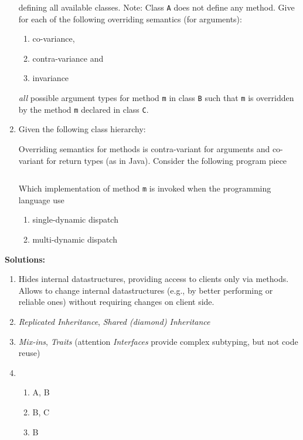 \documentclass{article}
\newcommand{\solution}[1] {\textbf{Solutions:}\\ #1}
\newcommand{\comment}[1]{\marginpar{#1}}
\begin{document}
\begin{enumerate}
\begin{center}
\end{center}
defining all available classes. Note: Class \lstinline!A! does not
define any method.
Give for each of the following overriding semantics (for arguments):
\begin{enumerate}
  \item co-variance,
  \item contra-variance and
  \item invariance
\end{enumerate}
\emph{all} possible argument types for method \lstinline!m! in class
\lstinline!B! such that \lstinline!m! is overridden by the method
\lstinline!m! declared in class \lstinline!C!.  \comment{\textbf{3
    points}}
\item Given the following class hierarchy:
\begin{tikzpicture}
\end{tikzpicture}
Overriding semantics for methods is contra-variant for arguments and
co-variant for return types (as in Java). Consider the following
program piece
\begin{lstlisting}
\end{lstlisting}
Which implementation of method \lstinline!m! is invoked when the
programming language use
\begin{enumerate}
\item single-dynamic dispatch
\item multi-dynamic dispatch
\end{enumerate}

\end{enumerate}

\solution{
\begin{enumerate}
\item Hides internal datastructures, providing access to clients only
  via methods. Allows to change internal datastructures (e.g., by
  better performing or reliable ones) without requiring changes on
  client side.
\item \emph{Replicated Inheritance}, \emph{Shared (diamond)
    Inheritance}
\item \emph{Mix-ins}, \emph{Traits} (attention \emph{Interfaces}
  provide complex subtyping, but not code reuse)
\item 
    \begin{enumerate}
      \item A, B
      \item B, C
      \item B
    \end{enumerate}
\end{enumerate}
}
\end{document}
